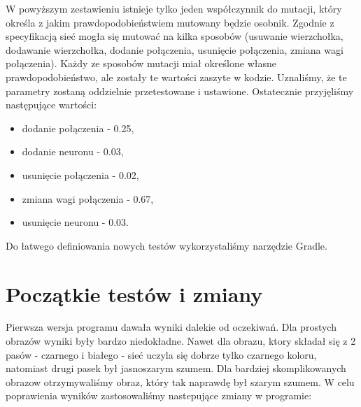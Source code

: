 \documentclass[12pt,a4paper,oneside]{article}
\begin{document}
W powyższym zestawieniu istnieje tylko jeden współczynnik do mutacji, który określa z jakim prawdopodobieństwiem mutowany będzie osobnik. Zgodnie z specyfikacją sieć mogła się mutować na kilka sposobów (usuwanie wierzchołka, dodawanie wierzchołka, dodanie połączenia, usunięcie połączenia, zmiana wagi połączenia). Każdy ze sposobów mutacji miał określone własne prawdopodobieństwo, ale zostały te wartości zaszyte w kodzie. Uznaliśmy, że te parametry zostaną oddzielnie przetestowane i ustawione. Ostatecznie przyjęliśmy następujące wartości:
\begin{itemize}
\item dodanie połączenia - 0.25,
\item dodanie neuronu - 0.03,
\item usunięcie połączenia - 0.02,
\item zmiana wagi połączenia - 0.67,
\item usunięcie neuronu - 0.03.
\end{itemize}

Do łatwego definiowania nowych testów wykorzystaliśmy narzędzie Gradle.

\section{Początkie testów i zmiany}
Pierwsza wersja programu dawała wyniki dalekie od oczekiwań. Dla prostych obrazów wyniki były bardzo niedokładne. Nawet dla obrazu, ktory składał się z 2 pasów - czarnego i białego - sieć uczyla się dobrze tylko czarnego koloru, natomiast drugi pasek był jasnoszarym szumem. Dla bardziej skomplikowanych obrazow otrzymywaliśmy obraz, który tak naprawdę był szarym szumem. W celu poprawienia wyników zastosowaliśmy nastepujące zmiany w programie:
\end{document}
